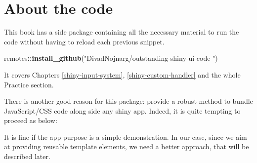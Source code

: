 \documentclass[
]{book}
\newenvironment{Shaded}{\begin{snugshade}}{\end{snugshade}}
\newcommand{\ControlFlowTok}[1]{\textcolor[rgb]{0.13,0.29,0.53}{\textbf{#1}}}
\newcommand{\DataTypeTok}[1]{\textcolor[rgb]{0.13,0.29,0.53}{#1}}
\newcommand{\KeywordTok}[1]{\textcolor[rgb]{0.13,0.29,0.53}{\textbf{#1}}}
\newcommand{\NormalTok}[1]{#1}
\newcommand{\OperatorTok}[1]{\textcolor[rgb]{0.81,0.36,0.00}{\textbf{#1}}}
\newcommand{\StringTok}[1]{\textcolor[rgb]{0.31,0.60,0.02}{#1}}
\begin{document}
\hypertarget{about-the-code}{%
\section{About the code}\label{about-the-code}}

This book has a side package containing all the necessary material to run the code without having to reload each previous snippet.

\begin{Shaded}
\begin{Highlighting}[]
\NormalTok{remotes}\OperatorTok{::}\KeywordTok{install_github}\NormalTok{(}\StringTok{"DivadNojnarg/outstanding-shiny-ui-code}
\StringTok{"}\NormalTok{)}
\end{Highlighting}
\end{Shaded}

It covers Chapters \ref{shiny-input-system}, \ref{shiny-custom-handler} and the whole Practice section.

There is another good reason for this package: provide a robust method to bundle JavaScript/CSS code along side any shiny app. Indeed, it is quite tempting to proceed as below:

\begin{Shaded}
\end{Shaded}

It is fine if the app purpose is a simple demonstration. In our case, since we aim at providing reusable template elements, we need a better approach, that will be described later.
\end{document}
